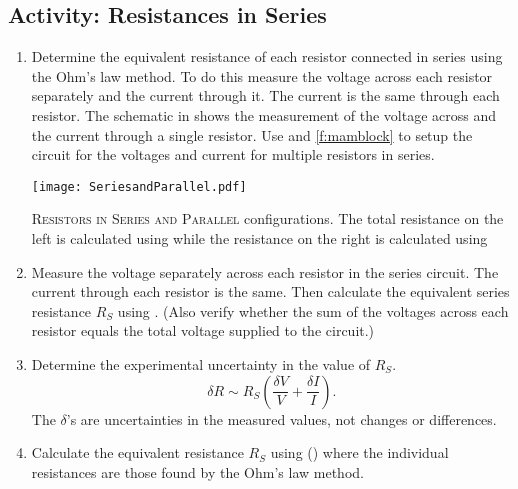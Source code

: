 \subsection{Activity: Resistances in Series} \label{s:series}
\begin{enumerate}
	\item \label{l:eqs} Determine the equivalent resistance of each resistor connected in series using the Ohm's law method. To do this measure the voltage across each resistor separately and the current through it. The current is the same through each resistor. The schematic in  shows the measurement of the voltage across and the current through a single resistor. Use  and \ref{f:mamblock} to setup the circuit for the voltages and current for multiple resistors in series.
	
\begin{marginfigure}
	\centering
	\texttt{[image: SeriesandParallel.pdf]}
	\caption[Series and Parallel Resistors]{\textsc{Resistors in Series and Parallel} configurations.  The total resistance on the left is calculated using  while the resistance on the right is calculated using }
	\label{f:resistor-series-par}
\end{marginfigure}

	\item Measure the voltage separately across each resistor in the series circuit. The current through each resistor is the same. Then calculate the equivalent series resistance $R_S$ using . (Also verify whether the sum of the voltages across each resistor equals the total voltage supplied to the circuit.)
	\item Determine the experimental uncertainty in the value of $R_S$. %
	\[ \delta R \sim R_S\left( \frac{\delta V}{V} + \frac{\delta I}{I} \right). \] 
	The $\delta$'s are uncertainties  in the measured values, not changes or differences.
	
	\item Calculate the equivalent resistance $R_S$ using () where the individual resistances are those found by the Ohm's law method. %
\end{enumerate}



